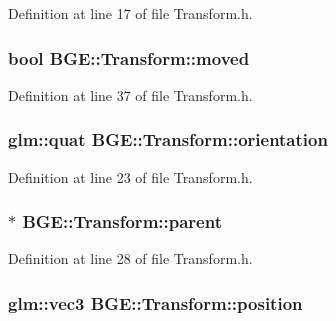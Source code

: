 Definition at line 17 of file Transform.\-h.

\hypertarget{class_b_g_e_1_1_transform_a7898a1ec8e3133d07f8961cb117697d9}{
\subsubsection[{moved}]{\setlength{\rightskip}{0pt plus 5cm}bool B\-G\-E\-::\-Transform\-::moved}}\label{class_b_g_e_1_1_transform_a7898a1ec8e3133d07f8961cb117697d9}


Definition at line 37 of file Transform.\-h.

\hypertarget{class_b_g_e_1_1_transform_a34cb89e882e27db3bc4b42364f9209d7}{
\subsubsection[{orientation}]{\setlength{\rightskip}{0pt plus 5cm}glm\-::quat B\-G\-E\-::\-Transform\-::orientation}}\label{class_b_g_e_1_1_transform_a34cb89e882e27db3bc4b42364f9209d7}


Definition at line 23 of file Transform.\-h.

\hypertarget{class_b_g_e_1_1_transform_a37c5a64f2875db65e0af83ee507f547a}{
\subsubsection[{parent}]{$\ast$ B\-G\-E\-::\-Transform\-::parent}}\label{class_b_g_e_1_1_transform_a37c5a64f2875db65e0af83ee507f547a}


Definition at line 28 of file Transform.\-h.

\hypertarget{class_b_g_e_1_1_transform_a6ed8b5c863f8194874bb7f67050ad733}{
\subsubsection[{position}]{\setlength{\rightskip}{0pt plus 5cm}glm\-::vec3 B\-G\-E\-::\-Transform\-::position}}\label{class_b_g_e_1_1_transform_a6ed8b5c863f8194874bb7f67050ad733}


